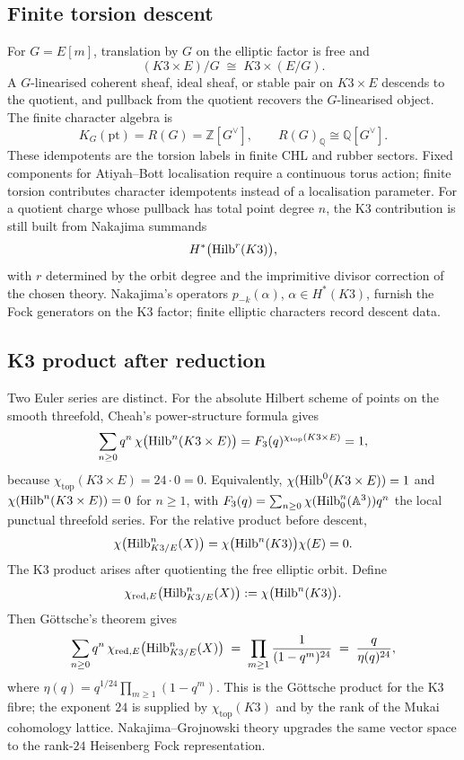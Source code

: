 \subsection*{Finite torsion descent}

For \(G=E[m]\), translation by \(G\) on the elliptic factor is free and
\[
  (K3\times E)/G \;\cong\; K3\times(E/G).
\]
A \(G\)-linearised coherent sheaf, ideal sheaf, or stable pair on
\(K3\times E\) descends to the quotient, and pullback from the quotient
recovers the \(G\)-linearised object.  The finite character algebra is
\[
  K_G(\mathrm{pt})=R(G)=\mathbb Z[G^\vee],
  \qquad
  R(G)_{\mathbb Q}\cong\mathbb Q[G^\vee].
\]
These idempotents are the torsion labels in finite CHL and rubber
sectors.  Fixed components for Atiyah--Bott localisation require a
continuous torus action; finite torsion contributes character idempotents
instead of a localisation parameter.
For a quotient charge whose pullback has total point degree \(n\), the
K3 contribution is still built from Nakajima summands
\[
  H^*\bigl(\mathrm{Hilb}^r(K3)\bigr),
\]
with \(r\) determined by the orbit degree and the imprimitive divisor
correction of the chosen theory.  Nakajima's operators
\(p_{-k}(\alpha)\), \(\alpha\in H^{*}(K3)\), furnish the Fock generators
on the K3 factor; finite elliptic characters record descent data.

\subsection*{K3 product after reduction}

Two Euler series are distinct.  For the absolute Hilbert scheme
of points on the smooth threefold, Cheah's power-structure formula gives
\[
  \sum_{n\geq 0} q^{n}\,\chi\bigl(\mathrm{Hilb}^{n}(K3\times E)\bigr)
   = F_3(q)^{\chi_{\mathrm{top}}(K3\times E)}
   =1,
\]
because \(\chi_{\mathrm{top}}(K3\times E)=24\cdot0=0\).  Equivalently,
\(\chi(\mathrm{Hilb}^{0}(K3\times E))=1\) and
\(\chi(\mathrm{Hilb}^{n}(K3\times E))=0\) for \(n\geq1\), with
\(F_3(q)=\sum_{n\geq0}\chi(\mathrm{Hilb}^{n}_{0}(\mathbb A^3))q^n\) the local
punctual threefold series.  For the relative product before descent,
\[
  \chi\bigl(\mathrm{Hilb}^{n}_{K3/E}(X)\bigr)
  =
  \chi\bigl(\mathrm{Hilb}^{n}(K3)\bigr)\chi(E)
  =
  0.
\]
The K3 product arises after quotienting the free elliptic orbit.
Define
\[
  \chi_{\mathrm{red},E}\bigl(\mathrm{Hilb}^{n}_{K3/E}(X)\bigr)
  :=
  \chi\bigl(\mathrm{Hilb}^{n}(K3)\bigr).
\]
Then Göttsche's theorem gives
\[
  \sum_{n\geq 0} q^{n}\,\chi_{\mathrm{red},E}\bigl(\mathrm{Hilb}^{n}_{K3/E}(X)\bigr)
   \;=\;
  \prod_{m\geq 1}\frac{1}{(1-q^{m})^{24}}
  \;=\; \frac{q}{\eta(q)^{24}},
\]
where \(\eta(q)=q^{1/24}\prod_{m\geq1}(1-q^m)\).  This is the
Göttsche product for the K3 fibre; the exponent \(24\) is supplied by
\(\chi_{\mathrm{top}}(K3)\) and by the rank of the Mukai cohomology
lattice.  Nakajima--Grojnowski theory upgrades the same vector space to
the rank-\(24\) Heisenberg Fock representation.

